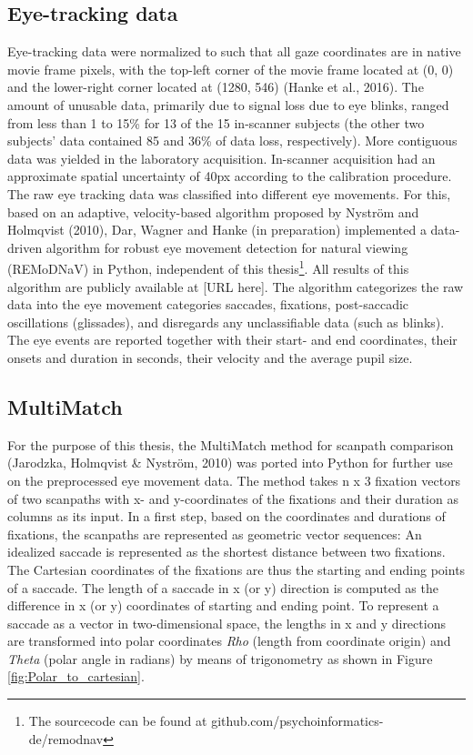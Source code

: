 \documentclass[a4paper, 11pt]{scrreprt}
\begin{document}
\subsection{Eye-tracking data}
Eye-tracking data were normalized to such that all gaze coordinates are in native movie frame pixels, with the top-left corner of the movie frame located at (0, 0) and the lower-right corner located at (1280, 546) (Hanke et al., 2016). The amount of unusable data, primarily due to signal loss due to eye blinks, ranged from less than 1 to 15\% for 13 of the 15 in-scanner subjects (the other two subjects’ data contained 85 and 36\% of data loss, respectively). More contiguous data was yielded in the laboratory acquisition. In-scanner acquisition had an approximate spatial uncertainty of 40px according to the calibration procedure. \newline
The raw eye tracking data was classified into different eye movements. For this, based on an adaptive, velocity-based algorithm proposed by Nyström and Holmqvist (2010), Dar, Wagner and  Hanke (in preparation) implemented a data-driven algorithm for robust eye movement detection for natural viewing (REMoDNaV) in Python, independent of this thesis\footnote{The sourcecode can be found at github.com/psychoinformatics-de/remodnav}. All results of this algorithm are publicly available at [URL here]. The algorithm categorizes the raw data into the eye movement categories saccades, fixations, post-saccadic oscillations (glissades), and disregards any unclassifiable data (such as blinks). The eye events are reported together with their start- and end coordinates, their onsets and duration in seconds, their velocity and the average pupil size.


\subsection{MultiMatch}
For the purpose of this thesis, the MultiMatch method for scanpath comparison (Jarodzka, Holmqvist \& Nyström, 2010) was ported into Python for further use on the preprocessed eye movement data. The method takes n x 3 fixation vectors of two scanpaths with x- and y-coordinates of the fixations and their duration as columns as its input. In a first step, based on the coordinates and durations of fixations, the scanpaths are represented as geometric vector sequences:
An idealized saccade is represented as the shortest distance between two fixations. The Cartesian coordinates of the fixations are thus the starting and ending points of a saccade. The length of a saccade in x (or y) direction is computed as the difference in x (or y) coordinates of starting and ending point.  To represent a saccade as a vector in two-dimensional space, the lengths in x and y directions are transformed into polar coordinates \textit{Rho} (length from coordinate origin) and \textit{Theta} (polar angle in radians)  by means of trigonometry as shown in Figure
 \ref{fig:Polar_to_cartesian}. 
\end{document}
